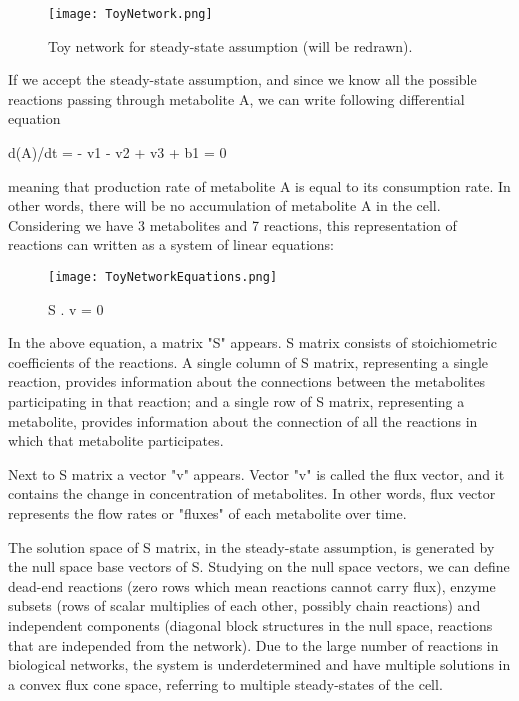 \begin{figure}[h]
\begin{center}
\texttt{[image: ToyNetwork.png]}
\end{center}
\caption[Toy network for steady-state assumption]{Toy network for steady-state assumption (will be redrawn).}
\label{fig:ToyNetwork}
\end{figure}

If we accept the steady-state assumption, and since we know all the possible reactions passing through metabolite A, we can write following differential equation

d(A)/dt = - v1 - v2 + v3 + b1 = 0

meaning that production rate of metabolite A is equal to its consumption rate. In other words, there will be no accumulation of metabolite A in the cell. Considering we have 3 metabolites and 7 reactions, this representation of reactions can written as a system of linear equations:
\begin{figure}[h]
\texttt{[image: ToyNetworkEquations.png]}
\begin{center}S . v = 0 \end{center}
\end{figure}

In the above equation, a matrix "S" appears. S matrix consists of stoichiometric coefficients of the reactions. A single column of S matrix, representing a single reaction, provides information about the connections between the metabolites participating in that reaction; and a single row of S matrix, representing a metabolite, provides information about the connection of all the reactions in which that metabolite participates.

Next to S matrix a vector "v" appears. Vector "v" is called the flux vector, and it contains the change in concentration of metabolites. In other words, flux vector represents the flow rates or "fluxes" of each metabolite over time.

The solution space of S matrix, in the steady-state assumption, is generated by the null space base vectors of S. Studying on the null space vectors, we can define dead-end reactions (zero rows which mean reactions cannot carry flux), enzyme subsets (rows of scalar multiplies of each other, possibly chain reactions) and independent components (diagonal block structures in the null space, reactions that are independed from the network). Due to the large number of reactions in biological networks, the system is underdetermined and have multiple solutions in a convex flux cone space, referring to multiple steady-states of the cell.

